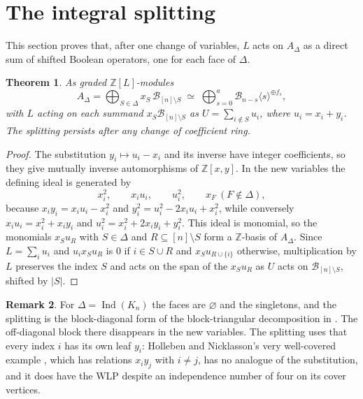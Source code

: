 \documentclass[11pt,a4paper]{article}
\newtheorem{theorem}{Theorem}[section]
\theoremstyle{definition}
\newtheorem{remark}[theorem]{Remark}
\newcommand{\B}{\mathcal B}
\begin{document}
\section{The integral splitting}\label{sec:split}

This section proves that, after one change of variables, $L$ acts on $A_\Delta$ as a direct sum of shifted Boolean operators, one for each face of $\Delta$.

\begin{theorem}\label{split}
As graded $\mathbb Z[L]$-modules
\[
 A_\Delta=\bigoplus_{S\in\Delta}x_S\,\B_{[n]\setminus S}
 \;\simeq\;\bigoplus_{s=0}^{a}\B_{n-s}\langle s\rangle^{\oplus f_s},
\]
with $L$ acting on each summand $x_S\B_{[n]\setminus S}$ as $U=\sum_{i\notin S}u_i$, where $u_i=x_i+y_i$. The splitting persists after any change of coefficient ring.
\end{theorem}
\begin{proof}
The substitution $y_i\mapsto u_i-x_i$ and its inverse have integer coefficients, so they give mutually inverse automorphisms of $\mathbb Z[x,y]$. In the new variables the defining ideal is generated by
\[
 x_i^2,\qquad x_iu_i,\qquad u_i^2,\qquad x_F\ (F\notin\Delta),
\]
because $x_iy_i=x_iu_i-x_i^2$ and $y_i^2=u_i^2-2x_iu_i+x_i^2$, while conversely $x_iu_i=x_i^2+x_iy_i$ and $u_i^2=x_i^2+2x_iy_i+y_i^2$. This ideal is monomial, so the monomials $x_Su_R$ with $S\in\Delta$ and $R\subseteq[n]\setminus S$ form a $\mathbb Z$-basis of $A_\Delta$. Since $L=\sum_iu_i$ and $u_ix_Su_R$ is $0$ if $i\in S\cup R$ and $x_Su_{R\cup\{i\}}$ otherwise, multiplication by $L$ preserves the index $S$ and acts on the span of the $x_Su_R$ as $U$ acts on $\B_{[n]\setminus S}$, shifted by $|S|$.
\end{proof}

\begin{remark}
For $\Delta=\operatorname{Ind}(K_n)$ the faces are $\varnothing$ and the singletons, and the splitting is the block-diagonal form of the block-triangular decomposition in \cite[Lemma~3.1]{HN}. The off-diagonal block there disappears in the new variables. The splitting uses that every index $i$ has its own leaf $y_i$: Holleben and Nicklasson's very well-covered example \cite[Example~3.18]{HN}, which has relations $x_iy_j$ with $i\ne j$, has no analogue of the substitution, and it does have the WLP despite an independence number of four on its cover vertices.
\end{remark}
\end{document}
